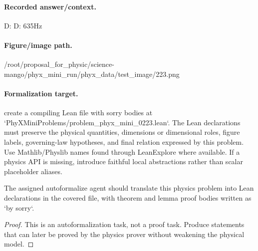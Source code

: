 \paragraph{Recorded answer/context.}
D: D: 635Hz

\paragraph{Figure/image path.}
/root/proposal\_for\_physic/science-mango/phyx\_mini\_run/phyx\_data/test\_image/223.png

\paragraph{Formalization target.}
create a compiling Lean file with sorry bodies at `PhyXMiniProblems/problem\_phyx\_mini\_0223.lean`. The Lean declarations must preserve the physical quantities, dimensions or dimensional roles, figure labels, governing-law hypotheses, and final relation expressed by this problem.
Use Mathlib/Physlib names found through LeanExplore where available. If a physics API is missing, introduce faithful local abstractions rather than scalar placeholder aliases.

\begin{theorem}
\label{thm:physics:phyx_mini_0223:target}
The assigned autoformalize agent should translate this physics problem into Lean declarations in the covered file, with theorem and lemma proof bodies written as `by sorry`.
\end{theorem}
\begin{proof}
This is an autoformalization task, not a proof task. Produce statements that can later be proved by the physics prover without weakening the physical model.
\end{proof}

